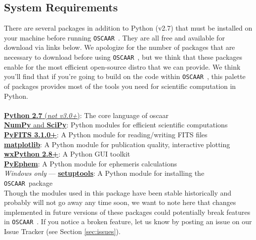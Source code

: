 \documentclass[a4paper]{article}
\newcommand{\code}[1]{\texttt{#1}}
\newcommand{\oscaar}{\code{OSCAAR}~}
\begin{document}
\subsection{System Requirements} \label{sec:systemRequirements}

There are several packages in addition to Python (v2.7) that must be installed on your machine before running \oscaar. They are all free and available for download via links below. We apologize for the number of packages that are necessary to download before using \oscaar, but we think that these packages enable for the most efficient open-source distro that we can provide.  We think you'll find that if you're going to build on the code within \oscaar, this palette of packages provides most of the tools you need for scientific computation in Python. \\ \\
\noindent
\indent \href{http://www.python.org/getit/}{\textbf{Python 2.7} (\textit{not v3.0+})}: The core language of oscaar \\
\indent \href{http://new.scipy.org/download.html}{\textbf{NumPy} and \textbf{SciPy}}: Python modules for efficient scientific computations \\
\indent \href{http://www.stsci.edu/resources/software_hardware/pyfits/}{\textbf{PyFITS 3.1.0+}}: A Python module for reading/writing FITS files \\
\indent \href{http://matplotlib.sourceforge.net/index.html}{\textbf{matplotlib}}: A Python module for publication quality, interactive plotting\\
\indent \href{http://www.wxpython.org/download.php#stable}{\textbf{wxPython 2.8+}}: A Python GUI toolkit \\
\indent \href{http://rhodesmill.org/pyephem/}{\textbf{PyEphem}}: A Python module for ephemeris calculations\\
\indent \textit{Windows only} --- \href{https://pypi.python.org/pypi/setuptools}{\textbf{setuptools}}: A Python module for installing the \oscaar package\\

\noindent Though the modules used in this package have been stable historically and probably will not go away any time soon, we want to note here that changes implemented in future versions of these packages could potentially break features in \oscaar. If you notice a broken feature, let us know by posting an issue on our Issue Tracker (see Section \ref{sec:issues}).
\end{document}
